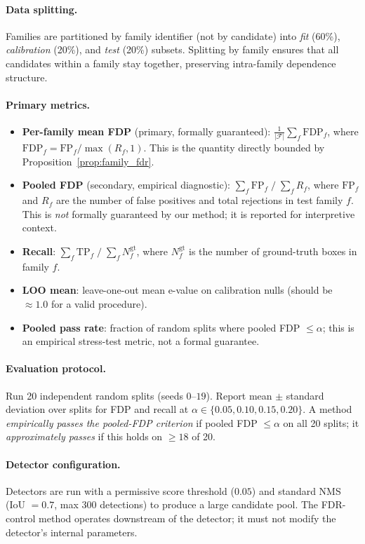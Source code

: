 \documentclass{article}
\theoremstyle{remark}
\newcommand{\1}{\mathbf{1}}
\begin{document}
\paragraph{Data splitting.}
Families are partitioned by family identifier (not by candidate) into
\emph{fit} (60\%), \emph{calibration} (20\%), and \emph{test} (20\%)
subsets. Splitting by family ensures that all candidates within a family
stay together, preserving intra-family dependence structure.

\paragraph{Primary metrics.}
\begin{itemize}
\item \textbf{Per-family mean FDP} (primary, formally guaranteed):
$\frac{1}{|\mathcal{F}|}\sum_f
\mathrm{FDP}_f$, where $\mathrm{FDP}_f = \mathrm{FP}_f / \max(R_f,1)$.
This is the quantity directly bounded by Proposition~\ref{prop:family_fdr}.
\item \textbf{Pooled FDP} (secondary, empirical diagnostic): $\sum_f \mathrm{FP}_f \;/\; \sum_f R_f$,
where $\mathrm{FP}_f$ and $R_f$ are the number of false positives and
total rejections in test family $f$. This is \emph{not} formally guaranteed
by our method; it is reported for interpretive context.
\item \textbf{Recall}: $\sum_f \mathrm{TP}_f \;/\; \sum_f N_f^{\mathrm{gt}}$, where
$N_f^{\mathrm{gt}}$ is the number of ground-truth boxes in family $f$.
\item \textbf{LOO mean}: leave-one-out mean e-value on calibration nulls
(should be $\approx 1.0$ for a valid procedure).
\item \textbf{Pooled pass rate}: fraction of random splits where pooled
FDP $\le \alpha$; this is an empirical stress-test metric, not a formal
guarantee.
\end{itemize}

\paragraph{Evaluation protocol.}
Run 20 independent random splits (seeds $0$--$19$). Report mean $\pm$
standard deviation over splits for FDP and recall at
$\alpha\in\{0.05, 0.10, 0.15, 0.20\}$. A method \emph{empirically passes the
pooled-FDP criterion} if pooled FDP $\le\alpha$ on all 20 splits; it
\emph{approximately passes} if this holds on $\ge 18$ of 20.

\paragraph{Detector configuration.}
Detectors are run with a permissive score threshold ($0.05$) and standard
NMS (IoU $=0.7$, max $300$ detections) to produce a large candidate pool.
The FDR-control method operates downstream of the detector; it must not
modify the detector's internal parameters.
\end{document}
